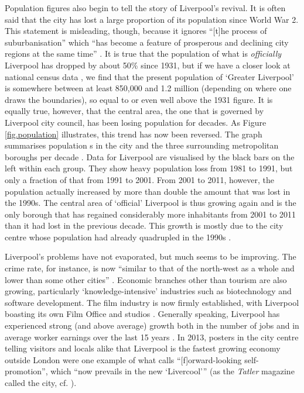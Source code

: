 Population figures also begin to tell the story of Liverpool's revival.
It is often said that the city has lost a large proportion of its population since World War 2.
This statement is misleading, though, because it ignores ``[t]he process of suburbanisation'' which ``has become a feature of prosperous and declining city regions at the same time'' \citep[21]{fraser2003}.
It is true that the population of what is \emph{officially} Liverpool has dropped by about 50\% since 1931, but if we have a closer look at national census data \parencite{nomis}, we find that the present population of `Greater Liverpool' is somewhere between at least 850,000 and 1.2 million (depending on where one draws the boundaries), so equal to or even well above the 1931 figure.
It is equally true, however, that the central area, the one that is governed by Liverpool city council, has been losing population for decades.
As Figure \ref{fig.population} illustrates, this trend has now been reversed.
The graph summarises population s in the city and the three surrounding metropolitan boroughs per decade \parencite{nomis}.
Data for Liverpool are visualised by the black bars on the left within each group.
They show heavy population loss from 1981 to 1991, but only a fraction of that from 1991 to 2001.
From 2001 to 2011, however, the population actually increased by more than double the amount that was lost in the 1990s.
The central area of `official' Liverpool is thus growing again and is the only borough that has regained considerably more inhabitants from 2001 to 2011 than it had lost in the previous decade.
This growth is mostly due to the city centre whose population had already quadrupled in the 1990s \citep[cf.][xix]{belchem2006c}.

Liverpool's problems have not evaporated, but much seems to be improving.
The crime rate, for instance, is now ``similar to that of the north-west as a whole and lower than some other cities''  \citep[235]{pooley2006}.
Economic branches other than tourism are also growing, particularly `knowledge-intensive' industries such as biotechnology \citep[cf.][204]{percy2003} and software development.
The film industry is now firmly established, with Liverpool boasting its own Film Office and studios \parencite[cf.][478--480]{murden2006}.
Generally speaking, Liverpool has experienced strong (and above average) growth both in the number of jobs and in average worker earnings over the last 15 years \parencite[cf.][4]{lcc2016}.
In 2013, posters in the city centre telling visitors and locals alike that Liverpool is the fastest growing economy outside London were one example of what \citet[54]{belchem2006a} calls ``[f]orward-looking self-promotion'', which ``now prevails in the new `Livercool'{}'' (as the \emph{Tatler} magazine called the city, cf. \citealt[484]{murden2006}).

